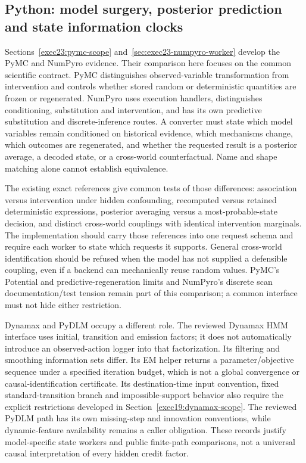 \subsection{Python: model surgery, posterior prediction and state information clocks}

Sections~\ref{exec23:pymc-scope} and~\ref{sec:exec23-numpyro-worker} develop the PyMC and NumPyro evidence. Their comparison here focuses on the common scientific contract. PyMC distinguishes observed-variable transformation from intervention and controls whether stored random or deterministic quantities are frozen or regenerated. NumPyro uses execution handlers, distinguishes conditioning, substitution and intervention, and has its own predictive substitution and discrete-inference routes. A converter must state which model variables remain conditioned on historical evidence, which mechanisms change, which outcomes are regenerated, and whether the requested result is a posterior average, a decoded state, or a cross-world counterfactual. Name and shape matching alone cannot establish equivalence.~\citep{exec23_pymc_sources,exec23_numpyro_sources}

The existing exact references give common tests of those differences: association versus intervention under hidden confounding, recomputed versus retained deterministic expressions, posterior averaging versus a most-probable-state decision, and distinct cross-world couplings with identical intervention marginals. The implementation should carry those references into one request schema and require each worker to state which requests it supports. General cross-world identification should be refused when the model has not supplied a defensible coupling, even if a backend can mechanically reuse random values. PyMC's Potential and predictive-regeneration limits and NumPyro's discrete scan documentation/test tension remain part of this comparison; a common interface must not hide either restriction.~\citep{exec23_pymc_reference,exec23_numpyro_reference,exec25_bsw_choice}

Dynamax and PyDLM occupy a different role. The reviewed Dynamax HMM interface uses initial, transition and emission factors; it does not automatically introduce an observed-action logger into that factorization. Its filtering and smoothing information sets differ. Its EM helper returns a parameter/objective sequence under a specified iteration budget, which is not a global convergence or causal-identification certificate. Its destination-time input convention, fixed standard-transition branch and impossible-support behavior also require the explicit restrictions developed in Section~\ref{exec19:dynamax-scope}. The reviewed PyDLM path has its own missing-step and innovation conventions, while dynamic-feature availability remains a caller obligation. These records justify model-specific state workers and public finite-path comparisons, not a universal causal interpretation of every hidden credit factor.~\citep{exec19_dynamax_source,exec19_dynamax_reference,exec25_pydyn_pydlm,exec25_pydyn_choice}

